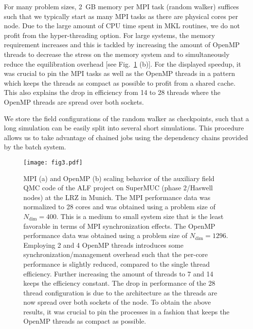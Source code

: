 \documentclass{SciPost}
\begin{document}
For many problem sizes, 2~GB memory per MPI task (random walker) suffices such that we typically start as many MPI tasks as there are physical cores per node. Due to the large amount of CPU time spent in MKL routines, we do not profit from the hyper-threading option. For large systems, the memory requirement increases and this is tackled by increasing the amount of OpenMP threads to decrease the stress on the memory system and to simultaneously reduce the equilibration overhead [see Fig.~\ref{fig_scaling} (b)]. For the displayed speedup, it was crucial to pin the MPI tasks as well as the OpenMP threads in a pattern which keeps the threads as compact as possible to profit from a shared cache. This also explains the drop in efficiency from 14 to 28 threads where the OpenMP threads are spread over both sockets. 

We store the field configurations of the random walker as checkpoints, such that a long simulation can be easily split into several short simulations. This procedure allows us to take advantage of chained jobs using the dependency chains provided by the batch system.
%
\begin{figure}[h]
	\begin{center}
		\texttt{[image: fig3.pdf]}
	\end{center}
	\caption{\label{fig_scaling} MPI (a) and OpenMP (b) scaling behavior of the auxiliary field QMC code of the ALF project on SuperMUC (phase 2/Haswell nodes) at the LRZ in Munich.
		The MPI performance data was normalized to 28 cores and was obtained using a problem size of $N_{\text{dim}}=400$. This is a medium to small system size that is the least favorable in terms of MPI synchronization effects.
		The OpenMP performance data was obtained using a problem size of $N_{\text{dim}}=1296$. Employing 2 and 4 OpenMP threads introduces some synchronization/management overhead such that the per-core performance is slightly reduced, compared to the single thread efficiency. Further increasing the amount of threads to 7 and 14 keeps the efficiency constant. The drop in performance of the 28 thread configuration is due to the architecture as the threads are now spread over both sockets of the node. To obtain the above results, it was crucial to pin the processes in a fashion that keeps the OpenMP threads as compact as possible.}
\end{figure}
%
\end{document}
